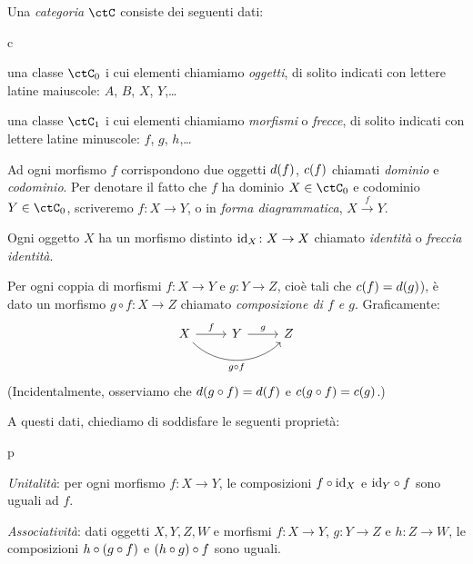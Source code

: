 \begin{definition}[Categoria]\label{def_categ}
	Una \emph{categoria} \(\ctC\) consiste dei seguenti dati:
	\begin{enumtag}{c}
		\item\label{c_1} una classe \(\ctC_0\) i cui elementi chiamiamo \emph{oggetti}, di solito indicati con lettere latine maiuscole: \(A\), \(B\), \(X\), \(Y\),\dots
		\item\label{c_2} una classe \(\ctC_1\) i cui elementi chiamiamo \emph{morfismi} o \emph{frecce}, di solito indicati con lettere latine minuscole: \(f\), \(g\), \(h\),\dots
		\item\label{c_3} Ad ogni morfismo $f$ corrispondono due oggetti $d(f)$, $c(f)$ chiamati \emph{dominio} e \emph{codominio}. Per denotare il fatto che $f$ ha dominio $X\in\ctC_0$ e codominio $Y\in\ctC_0$, scriveremo $f\colon X\to Y$, o in \emph{forma diagrammatica}, $X \xrightarrow{f} Y$.
  \item\label{c_4} Ogni oggetto $X$ ha un morfismo distinto $\mathrm{id}_X\colon X\to X$ chiamato \emph{identità} o \emph{freccia identità}.
  \item\label{c_5} Per ogni coppia di morfismi $f\colon X\to Y$ e $g\colon Y\to Z$, cioè tali che $c(f)=d(g)$), è dato un morfismo $g\circ f:X\to Z$ chiamato \emph{composizione di $f$ e $g$}. Graficamente:
		\[
			\begin{tikzcd}
				X \ar{r}{f}
				\ar[rounded corners,out=-45, in=225]{rr}[swap]{g\cmp f}
				& Y \ar{r}{g} & Z \\
				&&
			\end{tikzcd}
		\]
		(Incidentalmente, osserviamo che \(d(g\circ f)=d(f)\) e \(c(g\circ f)=c(g)\).)
	\end{enumtag}
	A questi dati, chiediamo di soddisfare le seguenti proprietà:
	\begin{enumtag}{p}
		\item \label{p_1} \emph{Unitalità}: per ogni morfismo \(f:X\to Y\), le composizioni \(f\circ\mathrm{id}_X\) e \(\mathrm{id}_Y\circ f\) sono uguali ad \(f\).
		\item \label{p_2} \emph{Associatività}: dati oggetti \(X,Y,Z,W\) e morfismi \(f:X\to Y\), \(g:Y\to Z\) e \(h:Z\to W\), le composizioni \(h\circ (g\circ f)\) e \((h\circ g)\circ f\) sono uguali.
	\end{enumtag}
\end{definition}
